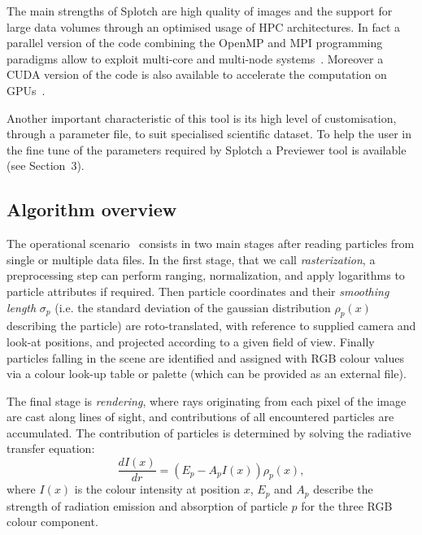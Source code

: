 \documentclass{egpubl}
\begin{document}
The main strengths of Splotch are high quality of images and the support for large data volumes through an optimised usage of HPC architectures. In fact a parallel version of the code combining the OpenMP and MPI programming paradigms allow to exploit multi-core and multi-node systems~\cite{JKR*10}. Moreover a CUDA version of the code is also available to accelerate the computation on GPUs~\cite{RGD*14}. 

Another important characteristic of this tool is its high level of customisation, through a parameter file, to suit specialised scientific dataset. To help the user in the fine tune of the parameters required by Splotch a Previewer tool is available (see Section~3).

\subsection{Algorithm overview }

The operational scenario~\cite{DRGI08} consists in two main stages after reading particles from single or multiple data files. 
In the first stage, that we call \textit{rasterization}, a preprocessing step can perform ranging, normalization, and apply logarithms to particle attributes if required. Then particle coordinates and their \textit{smoothing length} $\sigma_p$ (i.e. the standard deviation of the gaussian distribution $\rho_p(x)$ describing the particle) are roto-translated, with reference to supplied camera and look-at positions, and projected according to a given field of view. Finally particles falling in the scene are identified and assigned with RGB colour values via a colour look-up table or palette (which can be provided as an external file).

The final stage is \textit{rendering}, where rays originating from each pixel of the image are cast along lines of sight, and contributions of all encountered particles are accumulated. The contribution of particles is determined by solving the radiative transfer equation:
\begin{equation}\label{rad}
 \frac{d I(x)}{dr}=( E_p- A_p I(x))\rho_p(x),
\end{equation}
where $I(x)$ is the colour intensity at position $x$, $E_p$ and $A_p$ describe the strength of radiation emission and absorption of particle $p$ for the three RGB colour component.

\end{document}
